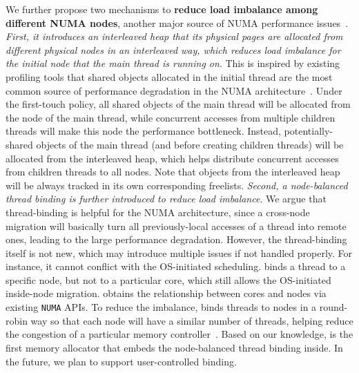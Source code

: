 We further propose two mechanisms to \textbf{reduce load imbalance among different NUMA nodes}, another major source of NUMA performance issues~\citep{Dashti:2013:TMH:2451116.2451157}. \textit{First, it introduces an interleaved heap that its physical pages are allocated from different physical nodes in an interleaved way, which reduces load imbalance for the initial node that the main thread is running on}. This is inspired by existing profiling tools that shared objects allocated in the initial thread are the most common source of performance degradation in the NUMA architecture~\citep{XULIU, MemProf}. Under the first-touch policy, all shared objects of the main thread will be allocated from the node of the main thread, while concurrent accesses from multiple children threads will make this node the performance bottleneck. Instead, potentially-shared objects of the main thread (and before creating children threads) will be allocated from the interleaved heap, which helps distribute concurrent accesses from children threads to all nodes. Note that objects from the interleaved heap will be always tracked in its own corresponding freelists. \textit{Second,  a node-balanced thread binding is further introduced to reduce load imbalance}. We argue that thread-binding is helpful for the NUMA architecture, since a cross-node migration will basically turn all previously-local accesses of a thread into remote ones, leading to the large performance degradation. However, the thread-binding itself is not new, which may introduce multiple issues if not handled properly. For instance, it cannot conflict with the OS-initiated scheduling. \NM{} binds a thread to a specific node, but not to a particular core, which still allows the OS-initiated inside-node migration. \NM{} obtains the relationship between cores and nodes via existing \texttt{NUMA} APIs. 
To reduce the imbalance, \NM{} binds threads to nodes in a round-robin way so that each node will have a similar number of threads, helping reduce the congestion of a particular memory controller~\citep{Blagodurov:2011:CNC:2002181.2002182}. Based on our knowledge, \NM{} is the first memory allocator that embeds the node-balanced thread binding inside. 
In the future, we plan to support user-controlled binding. 

 
